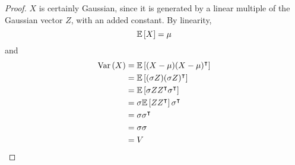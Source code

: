 \begin{proof}
	\(X\) is certainly Gaussian, since it is generated by a linear multiple of the Gaussian vector \(Z\), with an added constant.
	By linearity,
	\[
		\mathbb{E}\left[{X}\right] = \mu
	\]
	and
	\begin{align*}
		\operatorname{Var}\left({X}\right) & = \mathbb{E}\left[{(X - \mu)(X - \mu)^\intercal}\right]           \\
		        & = \mathbb{E}\left[{(\sigma Z)(\sigma Z)^\intercal}\right]         \\
		        & = \mathbb{E}\left[{\sigma Z Z^\intercal \sigma^\intercal}\right] \\
		        & = \sigma \mathbb{E}\left[{Z Z^\intercal}\right] \sigma^\intercal \\
		        & = \sigma \sigma^\intercal                         \\
		        & = \sigma \sigma                                    \\
		        & = V
	\end{align*}
\end{proof}

